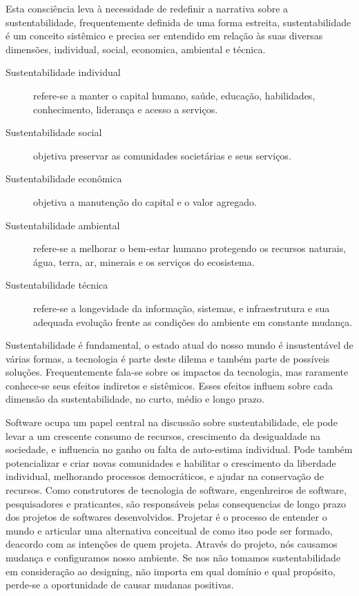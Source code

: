 Esta consciência leva à necessidade de redefinir a narrativa sobre a
sustentabilidade, frequentemente definida de uma forma
estreita, sustentabilidade é um conceito sistêmico e precisa ser entendido em
relação às suas diversas dimensões, individual, social, economica, ambiental e
técnica.

\begin{description}
  \item [Sustentabilidade individual]
    refere-se a manter o capital humano, saúde, educação, habilidades,
    conhecimento, liderança e acesso a serviços.
  \item [Sustentabilidade social]
    objetiva preservar as comunidades societárias e seus serviços.
  \item [Sustentabilidade econômica]
    objetiva a manutenção do capital e o valor agregado.
  \item [Sustentabilidade ambiental]
    refere-se a melhorar o bem-estar humano protegendo os recursos naturais,
    água, terra, ar, minerais e os serviços do ecosistema.
  \item [Sustentabilidade técnica]
    refere-se a longevidade da informação, sistemas, e infraestrutura e sua
    adequada evolução frente as condições do ambiente em constante mudança.
\end{description}

Sustentabilidade é fundamental, o estado atual do nosso
mundo é insustentável de várias formas,
a tecnologia é parte deste dilema e também parte de possíveis soluções.
Frequentemente fala-se sobre os impactos da tecnologia, mas raramente
conhece-se seus efeitos indiretos e sistêmicos. Esses efeitos influem sobre
cada dimensão da sustentabilidade, no curto, médio e longo prazo.

Software ocupa um papel central na discussão sobre sustentabilidade,
ele pode levar a um crescente consumo de recursos, crescimento  da desigualdade na
sociedade, e influencia no ganho ou falta de auto-estima individual. Pode também potencializar
e criar novas comunidades e habilitar o crescimento da liberdade individual, melhorando processos
democráticos, e ajudar na conservação de recursos. Como construtores de tecnologia de
software, engenhreiros de software, pesquisadores e praticantes, são responsáveis pelas consequencias de longo prazo dos
projetos de softwares desenvolvidos. Projetar é o processo de entender o mundo e articular uma
alternativa conceitual de como itso pode ser formado, deacordo com as intenções
de quem projeta. Através do projeto, nós causamos mudança e configuramos nosso
ambiente. Se nos não tomamos sustentabilidade em consideração ao designing,
não importa em qual domínio e qual propósito, perde-se a oportunidade
de causar mudanas positivas.

